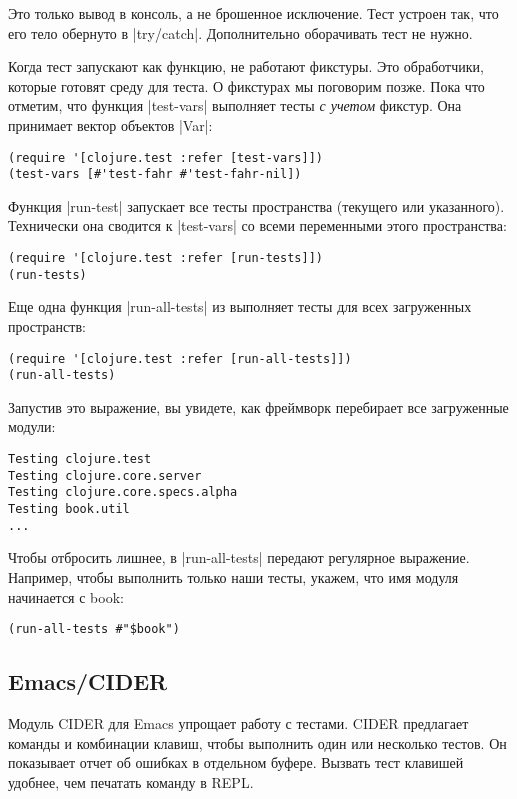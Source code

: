 Это только вывод в консоль, а не брошенное исключение. Тест устроен так, что его
тело обернуто в \spverb|try/catch|. Дополнительно оборачивать тест не нужно.

Когда тест запускают как функцию, не работают фикстуры. Это обработчики, которые
готовят среду для теста. О фикстурах мы поговорим позже. Пока что отметим, что
функция \spverb|test-vars| выполняет тесты \emph{с учетом} фикстур. Она
принимает вектор объектов \spverb|Var|:

\begin{verbatim}
(require '[clojure.test :refer [test-vars]])
(test-vars [#'test-fahr #'test-fahr-nil])
\end{verbatim}

Функция \spverb|run-test| запускает все тесты пространства (текущего или
указанного). Технически она сводится к \spverb|test-vars| со всеми переменными
этого пространства:

\begin{verbatim}
(require '[clojure.test :refer [run-tests]])
(run-tests)
\end{verbatim}

Еще одна функция \spverb|run-all-tests| из выполняет тесты для всех загруженных
пространств:

\begin{verbatim}
(require '[clojure.test :refer [run-all-tests]])
(run-all-tests)
\end{verbatim}

Запустив это выражение, вы увидете, как фреймворк перебирает все загруженные
модули:

\begin{verbatim}
Testing clojure.test
Testing clojure.core.server
Testing clojure.core.specs.alpha
Testing book.util
...
\end{verbatim}

Чтобы отбросить лишнее, в \spverb|run-all-tests| передают регулярное выражение.
Например, чтобы выполнить только наши тесты, укажем, что имя модуля начинается с
book:

\begin{verbatim}
(run-all-tests #"$book")
\end{verbatim}

\subsection{Emacs/CIDER}

Модуль CIDER для Emacs упрощает
работу с тестами. CIDER предлагает команды и комбинации клавиш, чтобы выполнить
один или несколько тестов. Он показывает отчет об ошибках в отдельном
буфере. Вызвать тест клавишей удобнее, чем печатать команду в REPL.

